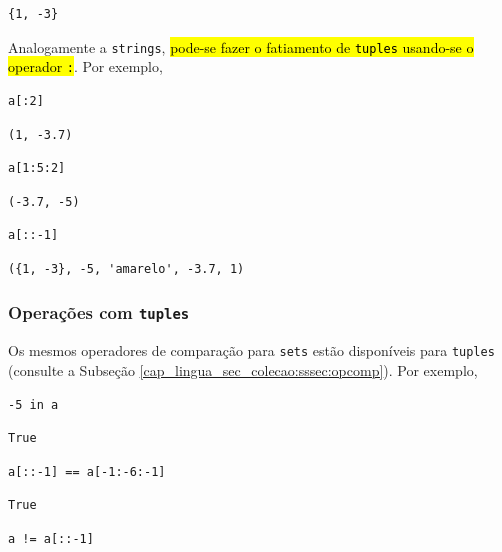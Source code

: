 \begin{verbatim}
{1, -3}
\end{verbatim}

Analogamente a \texttt{strings}, \hl{pode-se fazer o fatiamento de \texttt{tuples} usando-se o operador \texttt{:}}. Por exemplo,

\begin{lstlisting}
a[:2]
\end{lstlisting}

\begin{verbatim}
(1, -3.7)
\end{verbatim}

\begin{lstlisting}
a[1:5:2]
\end{lstlisting}

\begin{verbatim}
(-3.7, -5)
\end{verbatim}

\begin{lstlisting}
a[::-1]
\end{lstlisting}

\begin{verbatim}
({1, -3}, -5, 'amarelo', -3.7, 1)
\end{verbatim}


\subsubsection{Operações com \texttt{tuples}}

Os mesmos operadores de comparação para \texttt{sets} estão disponíveis para \texttt{tuples} (consulte a Subseção \ref{cap_lingua_sec_colecao:sssec:opcomp}). Por exemplo,

\begin{lstlisting}
-5 in a
\end{lstlisting}

\begin{verbatim}
True
\end{verbatim}

\begin{lstlisting}
a[::-1] == a[-1:-6:-1]
\end{lstlisting}

\begin{verbatim}
True
\end{verbatim}

\begin{lstlisting}
a != a[::-1]
\end{lstlisting}

